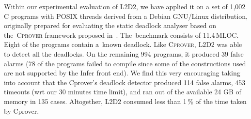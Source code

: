 \documentclass[runningheads]{llncs}
\begin{document}
Within our experimental evaluation of L2D2, we have applied it on a set of 1,002
C programs with POSIX threads derived from a Debian GNU/Linux distribution,
originally prepared for evaluating the static deadlock analyser based on
the~\textsc{Cprover} framework proposed in~\cite{kroening16}.
%
The~benchmark consists of 11.4\,MLOC.
%
Eight of the programs contain a~known deadlock.
%
Like \textsc{Cprover}, \textsc{L2D2} was able to detect all the deadlocks.
%
On the remaining 994 programs, it produced 39 false alarms (78 of the programs
failed to compile since some of the constructions used are not supported by the
Infer front end).
%
We find this very encouraging taking into account that the Cprover's deadlock
detector produced 114 false alarms, 453 timeouts (wrt our 30 minutes time
limit), and ran out of the available 24 GB of memory in 135 cases.
%
Altogether, L2D2 consumed less than 1\,\% of the time taken by Cprover.



\enlargethispage{7mm}

\vspace*{-3mm}


%
%
\end{document}
